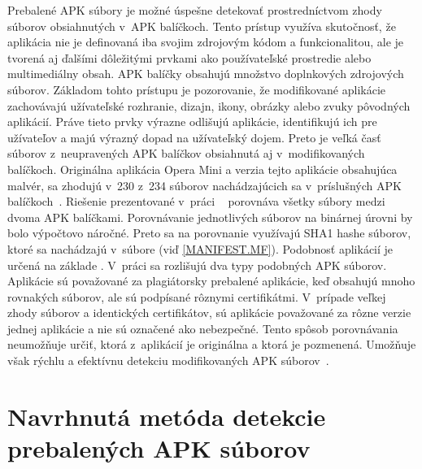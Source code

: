 Prebalené APK súbory je možné úspešne detekovať prostredníctvom zhody súborov obsiahnutých v~APK balíčkoch. Tento prístup využíva skutočnosť, že aplikácia nie je definovaná iba svojim zdrojovým kódom a funkcionalitou, ale je tvorená aj ďalšími dôležitými prvkami ako používateľské prostredie alebo multimediálny obsah. APK balíčky obsahujú množstvo doplnkových zdrojových súborov.  Základom tohto prístupu je pozorovanie, že modifikované aplikácie zachovávajú užívateľské rozhranie, dizajn, ikony, obrázky alebo zvuky pôvodných aplikácií. Práve tieto prvky výrazne odlišujú aplikácie, identifikujú ich pre užívateľov a majú výrazný dopad na užívateľský dojem. Preto je veľká časť súborov z~neupravených APK balíčkov obsiahnutá aj v~modifikovaných balíčkoch. Originálna aplikácia Opera Mini a verzia tejto aplikácie obsahujúca malvér, sa zhodujú v~230 z~234 súborov nachádzajúcich sa v~príslušných APK balíčkoch~\cite{Zhauniarovich2014}. Riešenie prezentované v~práci ~\cite{Zhauniarovich2014} porovnáva všetky súbory medzi dvoma APK balíčkami.  Porovnávanie jednotlivých súborov na binárnej úrovni by bolo výpočtovo náročné. Preto sa na porovnanie využívajú SHA1 hashe súborov, ktoré sa nachádzajú v~súbore  (viď \ref{MANIFEST.MF}). Podobnosť aplikácií je určená na základe . V~práci sa rozlišujú dva typy podobných APK súborov. Aplikácie sú považované za plagiátorsky prebalené aplikácie, keď obsahujú mnoho rovnakých súborov, ale sú podpísané rôznymi certifikátmi. V~prípade veľkej zhody súborov a  identických certifikátov, sú aplikácie považované za rôzne verzie jednej aplikácie a nie sú označené ako nebezpečné. Tento spôsob porovnávania neumožňuje určiť, ktorá z~aplikácií je originálna a ktorá je pozmenená. Umožňuje však rýchlu a efektívnu detekciu modifikovaných APK súborov~\cite{Zhauniarovich2014}. 

\section{Navrhnutá metóda detekcie prebalených APK súborov}

